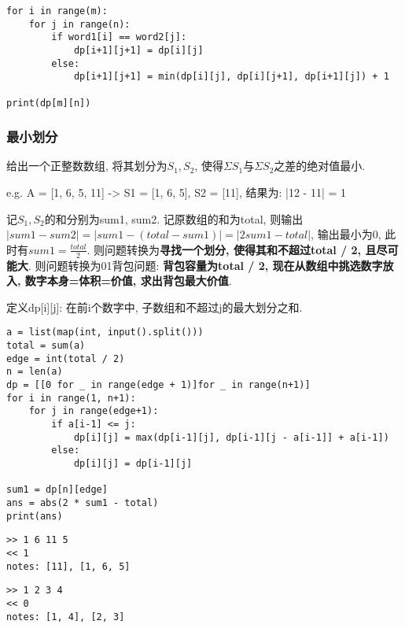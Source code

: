 \documentclass[../main]{subfiles}
\begin{document}
\begin{sloppy}
\begin{lstlisting}[style = Python]
for i in range(m):
    for j in range(n):
        if word1[i] == word2[j]:
            dp[i+1][j+1] = dp[i][j]
        else:
            dp[i+1][j+1] = min(dp[i][j], dp[i][j+1], dp[i+1][j]) + 1

print(dp[m][n])
\end{lstlisting}

\newpage
\subsubsection{最小划分}

给出一个正整数数组, 将其划分为$S_1, S_2$, 使得$\Sigma S_1$与$\Sigma S_2$之差的绝对值最小.

e.g. A = [1, 6, 5, 11] -> S1 = [1, 6, 5], S2 = [11], 结果为: |12 - 11| = 1

记$S_1, S_2$的和分别为sum1, sum2. 记原数组的和为total, 则输出$|sum1 - sum2| = |sum1 - (total - sum1)| = |2sum1 - total|$, 输出最小为0, 此时有$sum1 = \frac{total}{2}$. 则问题转换为\textbf{寻找一个划分, 使得其和不超过total / 2, 且尽可能大}. 则问题转换为01背包问题: \textbf{背包容量为total / 2, 现在从数组中挑选数字放入, 数字本身=体积=价值, 求出背包最大价值}.

定义dp[i][j]: 在前i个数字中, 子数组和不超过j的最大划分之和.

\begin{lstlisting}[style = Python]
a = list(map(int, input().split()))
total = sum(a)
edge = int(total / 2)
n = len(a) 
dp = [[0 for _ in range(edge + 1)]for _ in range(n+1)]
for i in range(1, n+1):
    for j in range(edge+1):
        if a[i-1] <= j:
            dp[i][j] = max(dp[i-1][j], dp[i-1][j - a[i-1]] + a[i-1])
        else:
            dp[i][j] = dp[i-1][j]

sum1 = dp[n][edge]
ans = abs(2 * sum1 - total)
print(ans)    
\end{lstlisting}

\begin{center}
\begin{minipage}[t]{0.48\textwidth}
\begin{center}
    \begin{verbatim}
>> 1 6 11 5
<< 1
notes: [11], [1, 6, 5]
    \end{verbatim}
\end{center}
\end{minipage}
\begin{minipage}[t]{0.48\textwidth}
\begin{center}
    \begin{verbatim}
>> 1 2 3 4
<< 0
notes: [1, 4], [2, 3]
    \end{verbatim}
\end{center}
\end{minipage}
\end{center}


\end{sloppy}
\end{document}
